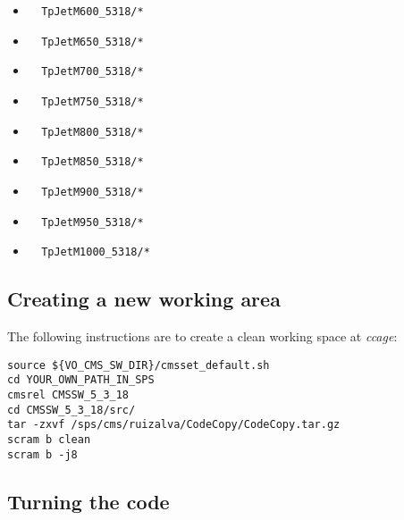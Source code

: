 \documentclass[11pt,a4paper]{article}
\begin{document}
\begin{itemize}
\begin{itemize}
  \item \begin{verbatim}  TpJetM600_5318/* \end{verbatim}
  \item \begin{verbatim}  TpJetM650_5318/* \end{verbatim}
  \item \begin{verbatim}  TpJetM700_5318/* \end{verbatim}
  \item \begin{verbatim}  TpJetM750_5318/* \end{verbatim}
  \item \begin{verbatim}  TpJetM800_5318/* \end{verbatim}
  \item \begin{verbatim}  TpJetM850_5318/* \end{verbatim}
  \item \begin{verbatim}  TpJetM900_5318/* \end{verbatim}
  \item \begin{verbatim}  TpJetM950_5318/* \end{verbatim}
  \item \begin{verbatim}  TpJetM1000_5318/* \end{verbatim}
  \end{itemize}
\end{itemize}

\subsection{Creating a new working area}

The following instructions are to create a clean working space at \textit{ccage}:

\begin{verbatim}
source ${VO_CMS_SW_DIR}/cmsset_default.sh
cd YOUR_OWN_PATH_IN_SPS
cmsrel CMSSW_5_3_18
cd CMSSW_5_3_18/src/
tar -zxvf /sps/cms/ruizalva/CodeCopy/CodeCopy.tar.gz
scram b clean
scram b -j8
\end{verbatim}

\subsection{Turning the code}
\end{document}
